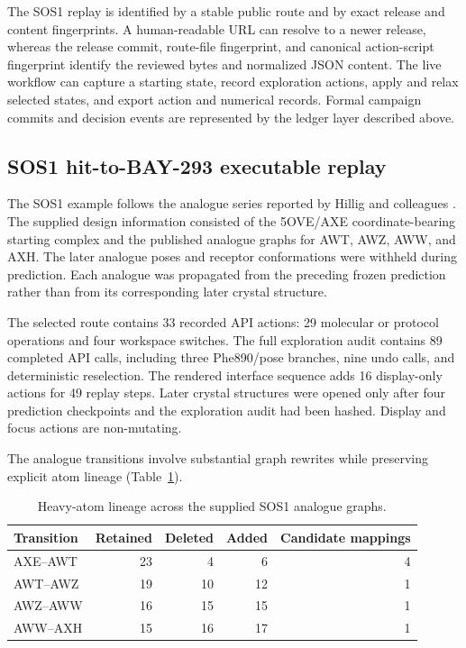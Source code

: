 \documentclass[11pt]{article}
\begin{document}
\begin{small}
The SOS1 replay is identified by a stable public route and by exact release and content fingerprints. A human-readable URL can resolve to a newer release, whereas the release commit, route-file fingerprint, and canonical action-script fingerprint identify the reviewed bytes and normalized JSON content. The live workflow can capture a starting state, record exploration actions, apply and relax selected states, and export action and numerical records. Formal campaign commits and decision events are represented by the ledger layer described above.

\subsection{SOS1 hit-to-BAY-293 executable replay}

The SOS1 example follows the analogue series reported by Hillig and colleagues \citep{hillig2019sos1}. The supplied design information consisted of the 5OVE/AXE coordinate-bearing starting complex and the published analogue graphs for AWT, AWZ, AWW, and AXH. The later analogue poses and receptor conformations were withheld during prediction. Each analogue was propagated from the preceding frozen prediction rather than from its corresponding later crystal structure.

The selected route contains 33 recorded API actions: 29 molecular or protocol operations and four workspace switches. The full exploration audit contains 89 completed API calls, including three Phe890/pose branches, nine undo calls, and deterministic reselection. The rendered interface sequence adds 16 display-only actions for 49 replay steps. Later crystal structures were opened only after four prediction checkpoints and the exploration audit had been hashed. Display and focus actions are non-mutating.

The analogue transitions involve substantial graph rewrites while preserving explicit atom lineage (Table~\ref{tab:appA_lineage}).

\begin{table}[htbp]
\centering\small
\caption{Heavy-atom lineage across the supplied SOS1 analogue graphs.}
\label{tab:appA_lineage}
\begin{tabular}{@{}lrrrr@{}}
\toprule
\textbf{Transition} & \textbf{Retained} & \textbf{Deleted} & \textbf{Added} & \textbf{Candidate mappings}\\
\midrule
AXE--AWT & 23 & 4 & 6 & 4\\
AWT--AWZ & 19 & 10 & 12 & 1\\
AWZ--AWW & 16 & 15 & 15 & 1\\
AWW--AXH & 15 & 16 & 17 & 1\\
\bottomrule
\end{tabular}
\end{table}


\end{small}
\end{document}
